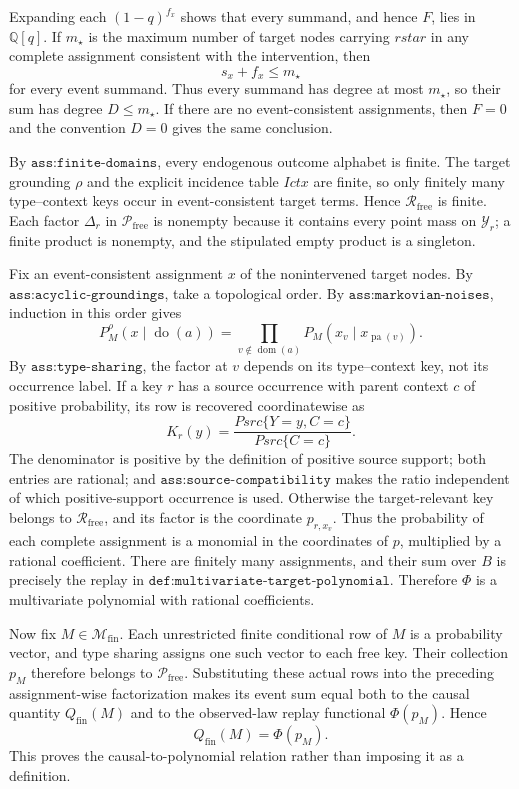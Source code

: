 Expanding each \((1-q)^{f_x}\) shows that every summand, and hence \(F\), lies in \(\mathbb Q[q]\).  If \(m_\star\) is the maximum number of target nodes carrying \(rstar\) in any complete assignment consistent with the intervention, then
\[
 s_x+f_x\leq m_\star
\]
for every event summand.  Thus every summand has degree at most \(m_\star\), so their sum has degree \(D\leq m_\star\).  If there are no event-consistent assignments, then \(F=0\) and the convention \(D=0\) gives the same conclusion.

By \(\texttt{ass:finite-domains}\), every endogenous outcome alphabet is finite.  The target grounding \(\rho\) and the explicit incidence table \(Ictx\) are finite, so only finitely many type--context keys occur in event-consistent target terms.  Hence \(\mathcal R_{\mathrm{free}}\) is finite.  Each factor \(\Delta_r\) in \(\mathcal P_{\mathrm{free}}\) is nonempty because it contains every point mass on \(\mathcal Y_r\); a finite product is nonempty, and the stipulated empty product is a singleton.

Fix an event-consistent assignment \(x\) of the nonintervened target nodes.  By \(\texttt{ass:acyclic-groundings}\), take a topological order.  By \(\texttt{ass:markovian-noises}\), induction in this order gives
\[
 P_M^\rho(x\mid\operatorname{do}(a))
 =\prod_{v\notin\operatorname{dom}(a)}
 P_M\!\left(x_v\mid x_{\operatorname{pa}(v)}\right).
\]
By \(\texttt{ass:type-sharing}\), the factor at \(v\) depends on its type--context key, not its occurrence label.  If a key \(r\) has a source occurrence with parent context \(c\) of positive probability, its row is recovered coordinatewise as
\[
 K_r(y)=
 \frac{Psrc\{Y=y,C=c\}}{Psrc\{C=c\}}.
\]
The denominator is positive by the definition of positive source support; both entries are rational; and \(\texttt{ass:source-compatibility}\) makes the ratio independent of which positive-support occurrence is used.  Otherwise the target-relevant key belongs to \(\mathcal R_{\mathrm{free}}\), and its factor is the coordinate \(p_{r,x_v}\).  Thus the probability of each complete assignment is a monomial in the coordinates of \(p\), multiplied by a rational coefficient.  There are finitely many assignments, and their sum over \(B\) is precisely the replay in \(\texttt{def:multivariate-target-polynomial}\).  Therefore \(\Phi\) is a multivariate polynomial with rational coefficients.

Now fix \(M\in\mathcal M_{\mathrm{fin}}\).  Each unrestricted finite conditional row of \(M\) is a probability vector, and type sharing assigns one such vector to each free key.  Their collection \(p_M\) therefore belongs to \(\mathcal P_{\mathrm{free}}\).  Substituting these actual rows into the preceding assignment-wise factorization makes its event sum equal both to the causal quantity \(Q_{\mathrm{fin}}(M)\) and to the observed-law replay functional \(\Phi(p_M)\).  Hence
\[
 Q_{\mathrm{fin}}(M)=\Phi(p_M).
\]
This proves the causal-to-polynomial relation rather than imposing it as a definition.

